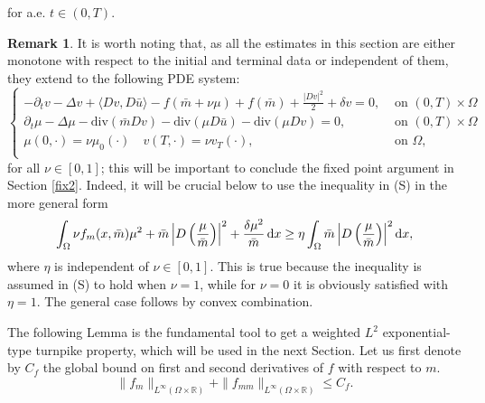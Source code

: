 \documentclass[10pt,a4paper,nouppercase,nowrite]{article}
\numberwithin{equation}{section}
\newcommand{\di}{{\rm d}}
\newcommand{\Sp}{{\textsc (S)} }
\newcommand{\R}{\mathbb{R}}
\theoremstyle{definition}
\newtheorem{rmk}[defn]{Remark}
\begin{document}
for a.e. $t \in (0,T)$.
\begin{rmk} \label{nurmk2}
	It is worth noting that, as all the estimates in this section are either monotone with respect to the initial and terminal data or independent of them, they extend to the following PDE system:
	\begin{equation} \label{nupde}
			\begin{cases}
			-\partial_t v - \Delta v + \langle Dv,D\bar{u} \rangle - f(\bar{m}+ \nu \mu) + f(\bar{m}) + \frac{|Dv|^2}{2} + \delta v=0,&  \text{ on } (0,T) \times \Omega \\
			\partial_t \mu - \Delta \mu - \text{div}(\bar{m}Dv) - \text{div}(\mu D\bar{u}) - \text{div}(\mu Dv)= 0,&  \text{ on } (0,T) \times \Omega  \\
			\mu(0,\cdot)=\nu \mu_0(\cdot) \quad v(T,\cdot)=\nu v_T(\cdot),& \text{ on }  \Omega, \\
		\end{cases}
	\end{equation}
for all $\nu \in [0,1]$; this will be important to conclude the fixed point argument in Section \ref{fix2}. Indeed, it will be crucial below to use the inequality in \Sp in the more general form
\[
\int_{\Omega} \nu f_m(x,\bar{m}) \mu^2 + \bar m\left| D \left( \frac{\mu}{\bar{m}} \right) \right|^2 + \frac{\delta \mu^2}{\bar{m}} \, \di x \geq \eta \int_{\Omega} \bar m\left| D \left( \frac{\mu}{\bar{m}} \right) \right|^2 \di x,
\]
where $\eta$ is independent of $\nu \in [0,1]$. This is true because the inequality is assumed in \Sp to hold when $\nu = 1$, while for $\nu = 0$ it is obviously satisfied with $\eta = 1$. The general case follows by convex combination.

\end{rmk}

The following Lemma is the fundamental tool to get a weighted $L^2$ exponential-type turnpike property, which will be used in the next Section. Let us first denote by $C_f$ the global bound on first and second derivatives of $f$ with respect to $m$.
$$ \| f_m \|_{L^{\infty}(\Omega \times \R)} + \| f_{mm} \|_{L^{\infty}(\Omega \times \R)} \le C_f.$$
\end{document}
